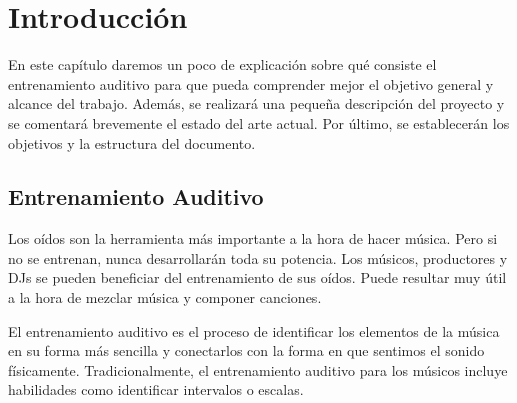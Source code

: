\documentclass[12pt,twoside,titlepage]{report}
\begin{document}

\pagestyle{fancy}
\renewcommand{\chaptermark}[1]{\markboth{Capítulo \thechapter.\ #1}{}}
\pagestyle{fancy}
\fancyhf{}
\fancyhead[LO]{\leftmark}
\fancyhead[RO]{}
\fancyhead[RE]{\nouppercase\rightmark}
\fancyhead[LE]{}
\fancyfoot[C]{\thepage}


   


\chapter{Introducción}

\cite{giaquinta}
En este capítulo daremos un poco de explicación sobre qué consiste el entrenamiento auditivo para que pueda comprender mejor el objetivo general y alcance del trabajo. Además, se realizará una pequeña descripción del proyecto y se comentará brevemente el estado del arte actual. Por último, se establecerán los objetivos y la estructura del documento.

\pagestyle{fancy}

\setlength{\parskip}{0.75em}
\renewcommand{\baselinestretch}{1.25}


\setcounter{page}{1}

\section{Entrenamiento Auditivo}

Los oídos son la herramienta más importante a la hora de hacer música. Pero si no se entrenan, nunca desarrollarán toda su potencia. Los músicos, productores y DJs se pueden beneficiar del entrenamiento de sus oídos. Puede resultar muy útil a la hora de mezclar música y componer canciones.

El entrenamiento auditivo es el proceso de identificar los elementos de la música en su forma más sencilla y conectarlos con la forma en que sentimos el sonido físicamente. Tradicionalmente, el entrenamiento auditivo para los músicos incluye habilidades como identificar intervalos o escalas. 
\end{document}
